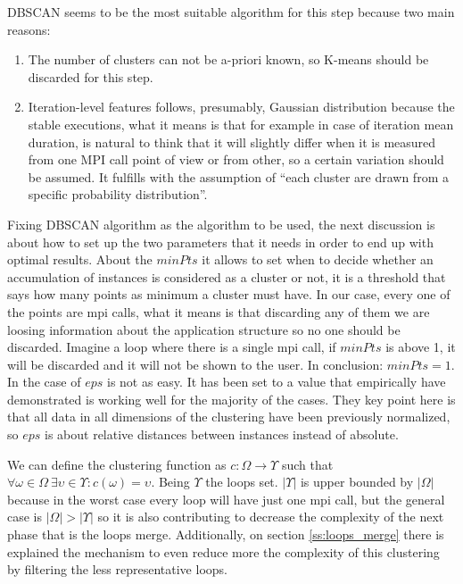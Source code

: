 DBSCAN seems to be the most suitable algorithm for this step because two main
reasons:
\begin{enumerate}[label=\roman*)]
  \item The number of clusters can not be a-priori known, so K-means should be
    discarded for this step.
  \item Iteration-level features follows, presumably, Gaussian distribution
    because the stable executions, what it means is that for example in case of
    iteration mean duration, is natural to think  that it will slightly differ
    when it is measured from one MPI call point of view or from other,
    so a certain variation should be assumed. It fulfills with the assumption 
    of ``each cluster are drawn from a specific
    probability distribution''.
\end{enumerate}

Fixing DBSCAN algorithm as the algorithm to be used, the next discussion is
about how to set up the two parameters that it needs in order to end up with
optimal results. About the $minPts$ it allows to set when to decide whether an
accumulation of instances is considered as a cluster or not, it is a threshold
that says how many points as minimum a cluster must have. In our case, every one
of the points are mpi calls, what it means is that discarding any of them we are
loosing information about the application structure so no one should be
discarded. Imagine a loop where there is a single mpi call, if $minPts$ is above
1, it will be discarded and it will not be shown to the user. In conclusion:
$minPts=1$. In the case of $eps$ is not as easy. It has been set to a value that
empirically have demonstrated is working well for the majority of the cases. 
They key point here is that all data in all dimensions of the clustering have been 
previously normalized, so $eps$ is about relative distances between instances
instead of absolute.

We can define the clustering function as $c : \Omega \rightarrow \Upsilon$ such
that $\forall \omega \in \Omega \medspace \exists \upsilon \in \Upsilon :
c(\omega) = \upsilon$. Being $\Upsilon$ the loops set. $|\Upsilon|$ is upper
bounded by $|\Omega|$ because in the worst case every loop will have just one
mpi call, but the general case is $|\Omega| > |\Upsilon|$ so it is also
contributing to decrease the complexity of the next phase that is the loops
merge. Additionally, on section \ref{ss:loops_merge} there is explained the 
mechanism to even reduce more the complexity of this clustering by filtering
the less representative loops.

